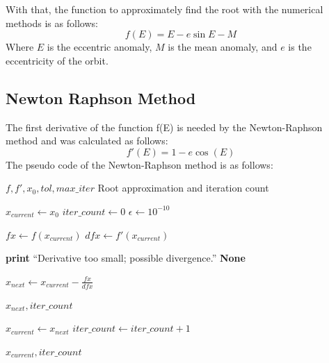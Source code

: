\documentclass[a4paper,11pt]{article}
\begin{document}
With that, the function to approximately find the root with the numerical methods is as follows:
	\begin{equation*}
        f(E) = E - e \sin E - M
    \end{equation*}
Where $E$ is the eccentric anomaly, $M$ is the mean anomaly, and $e$ is the eccentricity of the orbit.

\subsection{Newton Raphson Method}
The first derivative of the function f(E) is needed by the Newton-Raphson method and was calculated as follows:
\begin{equation*}
f'(E) = 1 - e \cos(E)
\end{equation*}
The pseudo code of the Newton-Raphson method is as follows:

\begin{algorithm}
\caption{Newton-Raphson Method}
\label{alg:newton_raphson}
\begin{algorithmic}[1]
    \Require $f, f', x_0, tol, max\_iter$
    \Ensure Root approximation and iteration count
    
    \State $x_{current} \gets x_0$
    \State $iter\_count \gets 0$
    \State $\epsilon \gets 10^{-10}$ 

        \State $fx \gets f(x_{current})$
        \State $dfx \gets f'(x_{current})$

            \State \textbf{print} ``Derivative too small; possible divergence.''
            \State \Return \textbf{None}
        \EndIf

        \State $x_{next} \gets x_{current} - \frac{fx}{dfx}$ 

            \State \Return $x_{next}, iter\_count$
        \EndIf

        \State $x_{current} \gets x_{next}$
        \State $iter\_count \gets iter\_count + 1$
    \EndWhile

    \State \Return $x_{current}, iter\_count$
\end{algorithmic}
\end{algorithm}
\end{document}
